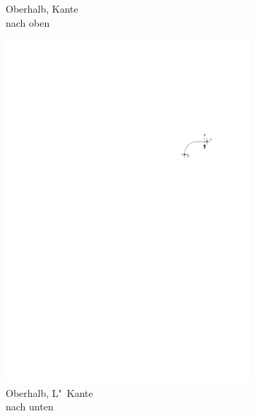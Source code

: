 \documentclass[a4paper]{scrreprt}
\theoremstyle{definition}
\begin{document}
\begin{figure}[h]
\begin{subfigure}[b]{0.2\textwidth}
                \caption{Oberhalb, Kante \\ nach oben}
                \label{fig:cutfinding_top_upwards}
        \end{subfigure}
        \quad
        \begin{subfigure}[b]{0.2\textwidth}
                \includegraphics[width=\textwidth]{schnitt_finden_top_downwardsL}
                \caption{Oberhalb, L"~Kante \\ nach unten}
                \label{fig:cutfinding_top_downwardsL}
        \end{subfigure}
        \quad
        \begin{subfigure}[b]{0.2\textwidth}

\end{subfigure}
\end{figure}
\end{document}
